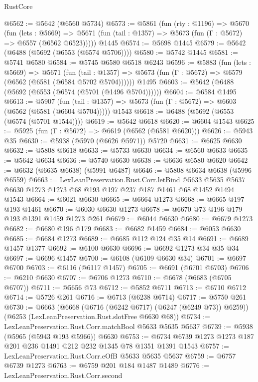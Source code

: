 \begin{lexlean}{RustCore}
\begin{coremodule}
@6562 := @5642 (@6560 @5734)
@6573 := @5861
    (fun (rty : @1196) =>
    @5670
      (fun (lets : @5669) =>
      @5671 (fun (tail : @1357) => @5673 (fun (Γ : @5672) => @6557 (@6562 @6523)))))
    @1445
@6574 := @5698 @1445
@6579 := @5642 (@6488 (@5692 (@6553 (@6574 @5706))))
@6580 := @5742 @1445
@6581 := @5741 @6580
@6584 := @5745 @6580 @6518 @6243
@6596 := @5883
    (fun (lets : @5669) =>
    @5671
      (fun (tail : @1357) => @5673 (fun (Γ : @5672) => @6579 (@6562 (@6581 (@6584 @5702 @5704))))))
    @1495
@6603 := @5642 (@6488 (@5692 (@6553 (@6574 (@5701 (@1496 @5704))))))
@6604 := @6584 @1495
@6613 := @5907
    (fun (tail : @1357) => @5673 (fun (Γ : @5672) => @6603 (@6562 (@6581 (@6604 @5704)))))
    @1543
@6618 := @6488 (@5692 (@6553 (@6574 (@5701 @1544))))
@6619 := @5642 @6618
@6620 := @6604 @1543
@6625 := @5925 (fun (Γ : @5672) => @6619 (@6562 (@6581 @6620)))
@6626 := @5943 @35
@6630 := @5938 (@5970 (@6626 @5971)) @5720
@6631 := @6625 @6630
@6632 := @5808 @6618
@6633 := @5733 @6630
@6634 := @6560 @6633
@6635 := @5642 @6634
@6636 := @5740 @6630
@6638 := @6636 @6580 @6620
@6642 := @6632 (@6635 @6638) (@5991 @6487)
@6646 := @5808 @6634 @6638 (@5996 @6559)
@6663 := LexLeanPreservation.Rust.Corr.letBind
    @5633
    @5635
    @5637
    @6630
    @1273
    @1273
    @68
    @193
    @197
    @237
    @187
    @1461
    @68
    @1452
    @1494
    @1543
@6664 := @6021 @6630
@6665 := @6664 @1273
@6668 := @6665 @197 @193 @1461
@6670 := @6030 @6630 @1273
@6678 := @6670 @73 @196 @179 @193 @1391 @1459 @1273 @261
@6679 := @6044 @6630
@6680 := @6679 @1273
@6682 := @6680 @196 @179
@6683 := @6682 @1459
@6684 := @6053 @6630
@6685 := @6684 @1273
@6689 := @6685 @112 @124 @35 @14
@6691 := @6689 @1457 @1377
@6692 := @6100 @6630
@6696 := @6692 @1273 @34 @35 @34
@6697 := @6696 @1457
@6700 := @6108 (@6109 @6630 @34)
@6701 := @6697 @6700
@6703 := @6116 (@6117 @1457)
@6705 := @6691 (@6701 @6703)
@6706 := @6210 @6630
@6707 := @6706 @1273
@6710 := @6678 (@6683 (@6705 @6707))
@6711 := @5656 @73
@6712 := @5852 @6711
@6713 := @6710 @6712
@6714 := @5726 @261
@6716 := @6713 (@6238 @6714)
@6717 := @5750 @261
@6730 := @6663
    (@6668 (@6716 (@6242 @6717) (@6247 (@6249 @73)) @6259))
    (@6253 (LexLeanPreservation.Rust.slotFree @6630 @68))
@6734 := LexLeanPreservation.Rust.Corr.matchBool @5633 @5635 @5637
@6739 := @5938 (@5965 (@5943 @193 @5966)) @6630
@6753 := @6734 @6739 @1273 @1273 @187 @201 @236 @1491 @212 @232 @1345 @78 @1351 @1391 @1543
@6757 := LexLeanPreservation.Rust.Corr.eOfB @5633 @5635 @5637
@6759 := @6757 @6739 @1273
@6763 := @6759 @201 @184 @1487 @1489
@6776 := LexLeanPreservation.Rust.Corr.second

\end{coremodule}
\end{lexlean}

